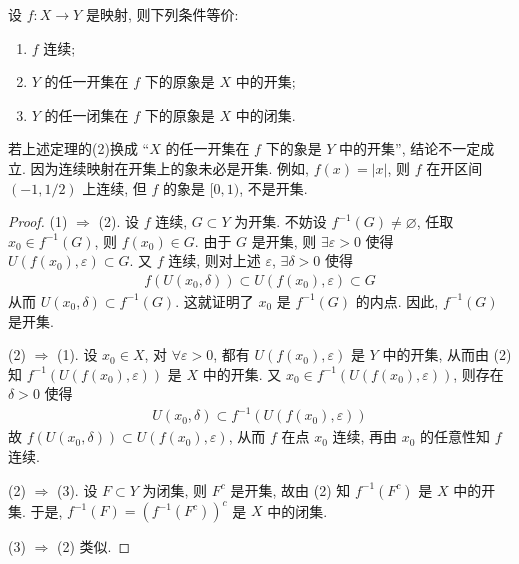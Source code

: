 \documentclass[../../main.tex]{subfiles}
\begin{document}
\begin{theorem}[连续映射的充要条件]\label{theorem:连续映射的充要条件}
设 $f : X \to Y$ 是映射, 则下列条件等价:
\begin{enumerate}[(1)]
\item $f$ 连续;
\item $Y$ 的任一开集在 $f$ 下的原象是 $X$ 中的开集;
\item $Y$ 的任一闭集在 $f$ 下的原象是 $X$ 中的闭集.
\end{enumerate}
\end{theorem}
\begin{remark}
若上述定理的(2)换成 “$X$ 的任一开集在 $f$ 下的象是 $Y$ 中的开集”, 结论不一定成立. 因为连续映射在开集上的象未必是开集. 例如, $f(x) = |x|$, 则 $f$ 在开区间 $(-1, 1/2)$ 上连续, 但 $f$ 的象是 $[0, 1)$, 不是开集. 
\end{remark}
\begin{proof}
(1) $\Rightarrow$ (2). 设 $f$ 连续, $G \subset Y$ 为开集. 不妨设 $f^{-1}(G) \neq \varnothing$, 任取 $x_0 \in f^{-1}(G)$, 则 $f(x_0) \in G$. 由于 $G$ 是开集, 则 $\exists \varepsilon > 0$ 使得 $U(f(x_0), \varepsilon) \subset G$. 又 $f$ 连续, 则对上述 $\varepsilon$, $\exists \delta > 0$ 使得
\begin{align*}
f(U(x_0, \delta)) \subset U(f(x_0), \varepsilon) \subset G
\end{align*}
从而 $U(x_0, \delta) \subset f^{-1}(G)$. 这就证明了 $x_0$ 是 $f^{-1}(G)$ 的内点. 因此, $f^{-1}(G)$ 是开集.

(2) $\Rightarrow$ (1). 设 $x_0 \in X$, 对 $\forall \varepsilon > 0$, 都有 $U(f(x_0), \varepsilon)$ 是 $Y$ 中的开集, 从而由 (2) 知 $f^{-1}(U(f(x_0), \varepsilon))$ 是 $X$ 中的开集. 又 $x_0 \in f^{-1}(U(f(x_0), \varepsilon))$, 则存在 $\delta > 0$ 使得
\begin{align*}
U(x_0, \delta) \subset f^{-1}(U(f(x_0), \varepsilon))
\end{align*}
故 $f(U(x_0, \delta)) \subset U(f(x_0), \varepsilon)$, 从而 $f$ 在点 $x_0$ 连续, 再由 $x_0$ 的任意性知 $f$ 连续.

(2) $\Rightarrow$ (3). 设 $F \subset Y$ 为闭集, 则 $F^c$ 是开集, 故由 (2) 知 $f^{-1}(F^c)$ 是 $X$ 中的开集. 于是, $f^{-1}(F) = (f^{-1}(F^c))^c$ 是 $X$ 中的闭集. 

(3) $\Rightarrow$ (2) 类似.
\end{proof}
\end{document}
